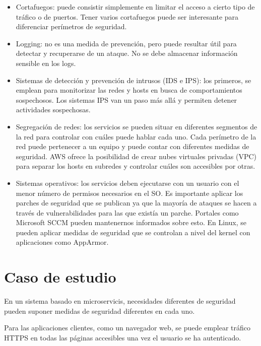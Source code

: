 \documentclass[11pt,a4paper]{article}
\begin{document}
\begin{itemize}

\item Cortafuegos: puede consistir simplemente en limitar el acceso a cierto tipo de tráfico o de puertos. Tener varios cortafuegos puede ser interesante para diferenciar perímetros de seguridad.

\item Logging: no es una medida de prevención, pero puede resultar útil para detectar y recuperarse de un ataque. No se debe almacenar información sensible en los logs.

\item Sistemas de detección y prevención de intrusos (IDS e IPS): los primeros, se emplean para monitorizar las redes y hosts en busca de comportamientos sospechosos. Los sistemas IPS van un paso más allá y permiten detener actividades sospechosas.

\item Segregación de redes: los servicios se pueden situar en diferentes segmentos de la red para controlar con cuáles puede hablar cada uno. Cada perímetro de la red puede pertenecer a un equipo y puede contar con diferentes medidas de seguridad. AWS ofrece la posibilidad de crear nubes virtuales privadas (VPC) para separar los hosts en subredes y controlar cuáles son accesibles por otras.

\item Sistemas operativos: los servicios deben ejecutarse con un usuario con el menor número de permisos necesarios en el SO. Es importante aplicar los parches de seguridad que se publican ya que la mayoría de ataques se hacen a través de vulnerabilidades para las que existía un parche. Portales como Microsoft SCCM pueden mantenernos informados sobre esto. En Linux, se pueden aplicar medidas de seguridad que se controlan a nivel del kernel con aplicaciones como AppArmor.

\end{itemize}

\section{Caso de estudio}

En un sistema basado en microservicis, necesidades diferentes de seguridad pueden suponer medidas de seguridad diferentes en cada uno.

Para las aplicaciones clientes, como un navegador web, se puede emplear tráfico HTTPS en todas las páginas accesibles una vez el usuario se ha autenticado.
\end{document}
